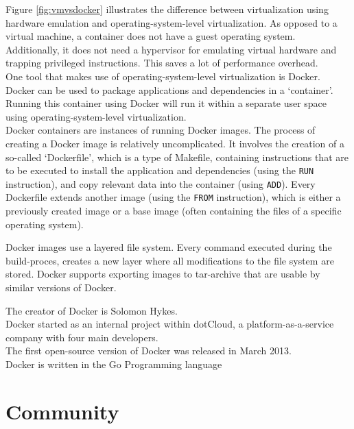 Figure \ref{fig:vmvsdocker} illustrates the difference between virtualization using hardware emulation and operating-system-level virtualization. As opposed to a virtual machine, a container does not have a guest operating system. Additionally, it does not need a hypervisor for emulating virtual hardware and trapping privileged instructions. This saves a lot of performance overhead. \\

One tool that makes use of operating-system-level virtualization is Docker. Docker can be used to package applications and dependencies in a `container'. Running this container using Docker will run it within a separate user space using operating-system-level virtualization. \\
Docker containers are instances of running Docker images. The process of creating a Docker image is relatively uncomplicated. It involves the creation of a so-called `Dockerfile', which is a type of Makefile, containing instructions that are to be executed to install the application and dependencies (using the \verb|RUN| instruction), and copy relevant data into the container (using \verb|ADD|). Every Dockerfile extends another image (using the \verb|FROM| instruction), which is either a previously created image or a base image (often containing the files of a specific operating system).

Docker images use a layered file system. Every command executed during the build-proces, creates a new layer where all modifications to the file system are stored.
Docker supports exporting images to tar-archive that are usable by similar versions of Docker.

The creator of Docker is Solomon Hykes. \\
Docker started as an internal project within dotCloud, a platform-as-a-service company with four main developers. \\
The first open-source version of Docker was released in March 2013.\\



Docker is written in the Go Programming language \\

\section{Community}

